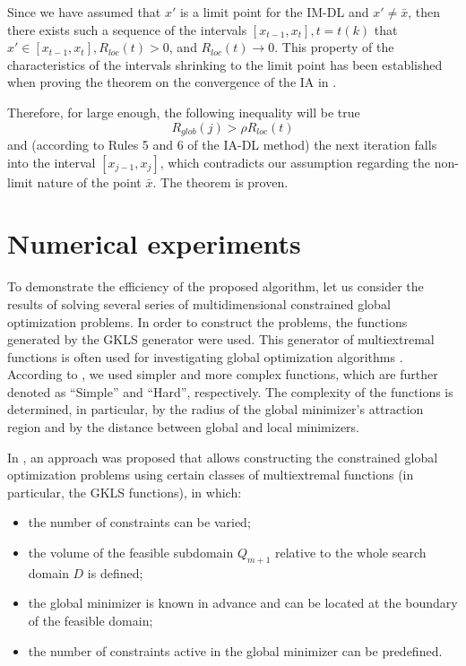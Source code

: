\documentclass[preprint]{elsarticle}
\begin{document}
	Since we have assumed that $x'$ is a limit point for the IM-DL and  $x' \neq \bar x$, then there exists such a sequence of the intervals $[x_{t-1}, x_t], t=t(k)$ that $x' \in [x_{t-1}, x_t], R_{loc}(t)>0$, and $R_{loc}(t) \rightarrow 0$. This property of the characteristics of the intervals shrinking to the limit point has been established when proving the theorem on the convergence of the IA in \cite{Sergeyev2013}.

	Therefore, for large enough, the following inequality will be true
\begin{equation}
	R_{glob}(j) > \rho R_{loc}(t)
\end{equation}
and (according to Rules 5 and 6 of the IA-DL method) the next iteration falls into the interval $[x_{j-1}, x_j]$, which contradicts our assumption regarding the non-limit nature of the point $\bar x$. The theorem is proven.



\section{Numerical experiments}
	To demonstrate the efficiency of the proposed algorithm, let us consider the results of solving several series of multidimensional constrained global optimization problems. In order to construct the problems, the functions generated by the GKLS generator \cite{Gaviano2003} were used. This generator of multiextremal functions is often used for investigating global optimization algorithms \cite{Paulavicius2014, Sergeyev2015,Barkalov2018}. According to \cite{Gaviano2003}, we used simpler and more complex functions, which are  further denoted as ``Simple'' and ``Hard'', respectively. The complexity of the functions is determined, in particular, by the radius of the global minimizer's attraction region and by the distance between global and local minimizers.
	
	In \cite{Gergel2017_2, Gergel2019}, an approach was proposed that allows constructing the constrained global optimization problems using certain classes of multiextremal functions (in particular, the GKLS functions), in which:
\begin{itemize}
  \item the number of constraints can be varied;
  \item the volume of the feasible subdomain $Q_{m+1}$ relative to the whole search domain $D$ is defined;
	\item the global minimizer is known in advance and can be located at the boundary of the feasible domain;
	\item the number of constraints active in the global minimizer can be predefined.
\end{itemize}	
\end{document}
